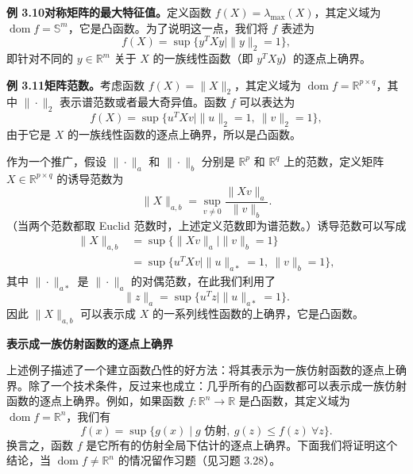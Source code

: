 \documentclass[UTF8, 12pt, fontset=fandol, oneside]{ctexart}
\DeclareMathOperator{\dom}{dom}
\begin{document}
\noindent\textbf{例 3.10\quad 对称矩阵的最大特征值。}\quad 定义函数 $f(X)=\lambda_{\max}(X)$，其定义域为 $\dom f=\mathbb{S}^m$，它是凸函数。为了说明这一点，我们将 $f$ 表述为
\[
f(X)=\sup\{y^TXy\mid \|y\|_2=1\},
\]
即针对不同的 $y\in\mathbb{R}^m$ 关于 $X$ 的一族线性函数（即 $y^TXy$）的逐点上确界。

\noindent\textbf{例 3.11\quad 矩阵范数。}\quad 考虑函数 $f(X)=\|X\|_2$，其定义域为 $\dom f=\mathbb{R}^{p\times q}$，其中 $\|\cdot\|_2$ 表示谱范数或者最大奇异值。函数 $f$ 可以表达为
\[
f(X)=\sup\{u^TXv\mid \|u\|_2=1,\ \|v\|_2=1\},
\]
由于它是 $X$ 的一族线性函数的逐点上确界，所以是凸函数。

作为一个推广，假设 $\|\cdot\|_a$ 和 $\|\cdot\|_b$ 分别是 $\mathbb{R}^p$ 和 $\mathbb{R}^q$ 上的范数，定义矩阵 $X\in\mathbb{R}^{p\times q}$ 的诱导范数为
\[
\|X\|_{a,b}=\sup_{v\neq0}\frac{\|Xv\|_a}{\|v\|_b}.
\]
（当两个范数都取 Euclid 范数时，上述定义范数即为谱范数。）诱导范数可以写成
\[
\begin{aligned}
\|X\|_{a,b}
&=\sup\{\|Xv\|_a\mid \|v\|_b=1\}\\
&=\sup\{u^TXv\mid \|u\|_{a*}=1,\ \|v\|_b=1\},
\end{aligned}
\]
其中 $\|\cdot\|_{a*}$ 是 $\|\cdot\|_a$ 的对偶范数，在此我们利用了
\[
\|z\|_a=\sup\{u^Tz\mid \|u\|_{a*}=1\}.
\]
因此 $\|X\|_{a,b}$ 可以表示成 $X$ 的一系列线性函数的上确界，它是凸函数。

\noindent\textbf{表示成一族仿射函数的逐点上确界}

上述例子描述了一个建立函数凸性的好方法：将其表示为一族仿射函数的逐点上确界。除了一个技术条件，反过来也成立：几乎所有的凸函数都可以表示成一族仿射函数的逐点上确界。例如，如果函数 $f:\mathbb{R}^n\to\mathbb{R}$ 是凸函数，其定义域为 $\dom f=\mathbb{R}^n$，我们有
\[
f(x)=\sup\{g(x)\mid g\text{ 仿射},\ g(z)\leq f(z)\ \forall z\}.
\]
换言之，函数 $f$ 是它所有的仿射全局下估计的逐点上确界。下面我们将证明这个结论，当 $\dom f\neq\mathbb{R}^n$ 的情况留作习题（见习题 3.28）。
\end{document}
